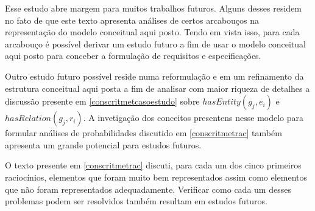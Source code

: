 Esse estudo abre margem para muitos trabalhos futuros. Alguns desses residem no fato de que este texto apresenta análises de certos arcabouços na representação do modelo conceitual aqui posto. Tendo em vista isso, para cada arcabouço é possível derivar um estudo futuro a fim de usar o modelo conceitual aqui posto para conceber a formulação de requisitos e especificações. 

Outro estudo futuro possível reside numa reformulação e em um refinamento da estrutura conceitual aqui posta a fim de analisar com maior riqueza de detalhes a discussão presente em \ref{conscritmetcasoestudo} sobre $hasEntity(g_j,e_i)$ e $hasRelation(g_j,r_i)$. A invetigação dos conceitos presentens nesse modelo para formular análises de probabilidades discutido em \ref{conscritmetrac} também apresenta um grande potencial para estudos futuros.

O texto presente em \ref{conscritmetrac} discuti, para cada um dos cinco primeiros raciocínios, elementos que foram muito bem representados assim como elementos que não foram representados adequadamente. Verificar como cada um desses problemas podem ser resolvidos também resultam em estudos futuros. 